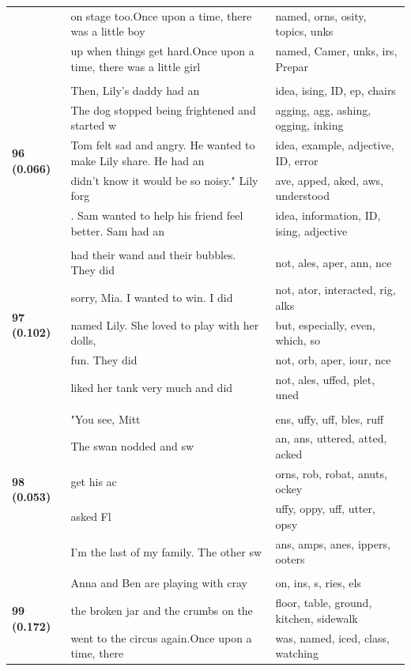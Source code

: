 \documentclass{article}
\theoremstyle{plain}
\theoremstyle{definition}
\theoremstyle{remark}
\begin{document}
\begin{longtable}{|p{}|p{}|p{}|}
& on stage too.Once upon a time, there was a little boy & named, orns, osity,  topics, unks \\
& up when things get hard.Once upon a time, there was a little girl & named,  Camer, unks, irs,  Prepar \\
& & \\
\multirow{5}{*}{\textbf{96 (0.066)}} & Then, Lily's daddy had an & idea, ising,  ID,  ep,  chairs \\
& The dog stopped being frightened and started w & agging, agg, ashing, ogging, inking \\
& Tom felt sad and angry. He wanted to make Lily share. He had an & idea,  example,  adjective,  ID,  error \\
& didn't know it would be so noisy." Lily forg & ave, apped, aked, aws,  understood \\
& . Sam wanted to help his friend feel better.  Sam had an & idea,  information,  ID, ising,  adjective \\
& & \\
\multirow{5}{*}{\textbf{97 (0.102)}} & had their wand and their bubbles. They did & not, ales, aper, ann, nce \\
& sorry, Mia. I wanted to win. I did & not, ator,  interacted, rig, alks \\
& named Lily. She loved to play with her dolls, & but,  especially,  even,  which,  so \\
& fun. They did & not,  orb, aper, iour, nce \\
& liked her tank very much and did & not, ales, uffed, plet, uned \\
& & \\
\multirow{5}{*}{\textbf{98 (0.053)}} & "You see, Mitt & ens, uffy, uff, bles, ruff \\
& The swan nodded and sw & an, ans, uttered, atted, acked \\
& get his ac & orns, rob, robat, anuts, ockey \\
& asked Fl & uffy, oppy, uff, utter, opsy \\
& I'm the last of my family. The other sw & ans, amps, anes, ippers, ooters \\
& & \\
\multirow{5}{*}{\textbf{99 (0.172)}} & Anna and Ben are playing with cray & on, ins, s, ries, els \\
& the broken jar and the crumbs on the & floor,  table,  ground,  kitchen,  sidewalk \\
& went to the circus again.Once upon a time, there & was, named, iced, class, watching \\

\end{longtable}
\end{document}
